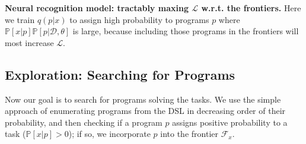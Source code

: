 \documentclass{article}
\newcommand{\lowerBound}{\mathscr{L}}
\newcommand{\probability}{\mathds{P}} %
\begin{document}
\textbf{Neural recognition model: tractably maxing $\lowerBound$ w.r.t. the
  frontiers.}  Here we train %
$q(p|x)$ to assign high probability to programs $p$ where
$\probability[x|p]\probability[p|\mathcal{D},\theta]$ is large, because including those programs
in the frontiers will most increase $\lowerBound$.  %





\subsection{Exploration: Searching for Programs}\label{explorationSection}

Now our goal is to search for programs solving the tasks.  We use the simple approach of enumerating programs from
the DSL  in decreasing order of their probability,
and then checking if a program $p$ assigns positive
probability to a task ($\probability[x|p] > 0$); if so, we incorporate $p$ 
into the frontier $\mathcal{F}_x$.
\end{document}
